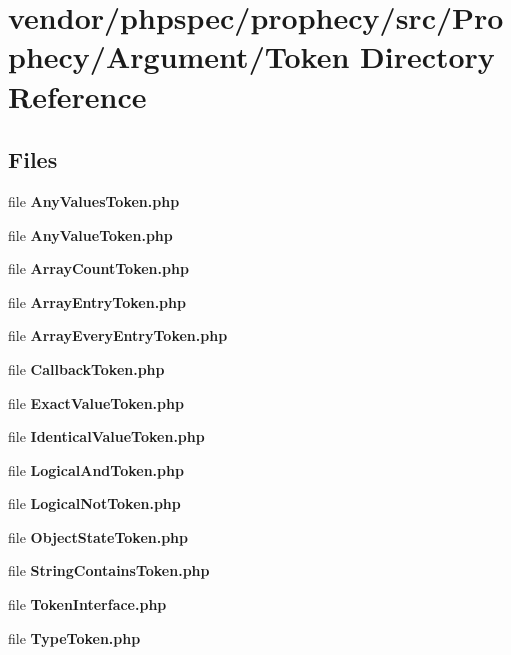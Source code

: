 \section{vendor/phpspec/prophecy/src/\+Prophecy/\+Argument/\+Token Directory Reference}
\label{dir_32427fbd462ce795f59a26afb4730b99}
\subsection*{Files}
\begin{DoxyCompactItemize}
\item 
file {\bf Any\+Values\+Token.\+php}
\item 
file {\bf Any\+Value\+Token.\+php}
\item 
file {\bf Array\+Count\+Token.\+php}
\item 
file {\bf Array\+Entry\+Token.\+php}
\item 
file {\bf Array\+Every\+Entry\+Token.\+php}
\item 
file {\bf Callback\+Token.\+php}
\item 
file {\bf Exact\+Value\+Token.\+php}
\item 
file {\bf Identical\+Value\+Token.\+php}
\item 
file {\bf Logical\+And\+Token.\+php}
\item 
file {\bf Logical\+Not\+Token.\+php}
\item 
file {\bf Object\+State\+Token.\+php}
\item 
file {\bf String\+Contains\+Token.\+php}
\item 
file {\bf Token\+Interface.\+php}
\item 
file {\bf Type\+Token.\+php}
\end{DoxyCompactItemize}
